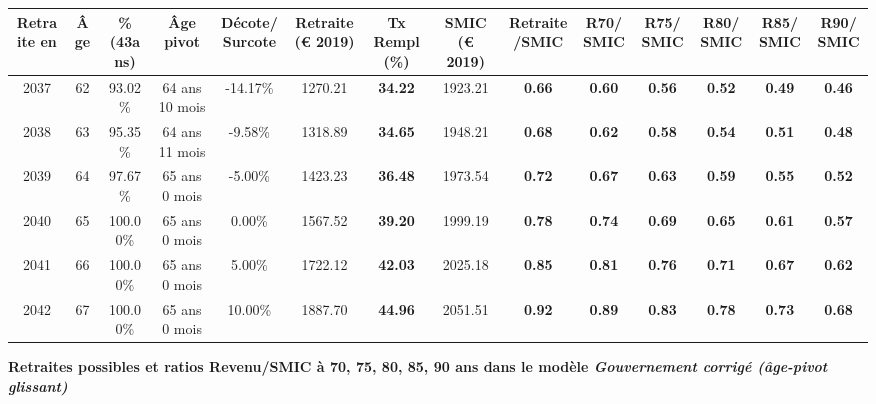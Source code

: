 \begin{adjustbox}{max width=\textwidth} 
\begin{tabular}[htb]{|c|c||c|c|c||c|c||c|c||c|c|c|c|c|} 
\hline 
 Retraite en &  Âge &  \%(43ans) &  Âge pivot &  Décote/Surcote &  Retraite (\euro{} 2019) &  Tx Rempl(\%) &  SMIC (\euro{} 2019) &  Retraite/SMIC &  R70/SMIC &  R75/SMIC &  R80/SMIC &  R85/SMIC &  R90/SMIC \\ 
\hline \hline 
 2037 &  62 &  93.02\% &  64 ans 10 mois &  -14.17\% &  1270.21 &  {\bf 34.22} &  1923.21 &  {\bf {\color{red} 0.66}} &  {\bf {\color{red} 0.60}} &  {\bf {\color{red} 0.56}} &  {\bf {\color{red} 0.52}} &  {\bf {\color{red} 0.49}} &  {\bf {\color{red} 0.46}} \\ 
\hline 
 2038 &  63 &  95.35\% &  64 ans 11 mois &  -9.58\% &  1318.89 &  {\bf 34.65} &  1948.21 &  {\bf {\color{red} 0.68}} &  {\bf {\color{red} 0.62}} &  {\bf {\color{red} 0.58}} &  {\bf {\color{red} 0.54}} &  {\bf {\color{red} 0.51}} &  {\bf {\color{red} 0.48}} \\ 
\hline 
 2039 &  64 &  97.67\% &  65 ans 0 mois &  -5.00\% &  1423.23 &  {\bf 36.48} &  1973.54 &  {\bf {\color{red} 0.72}} &  {\bf {\color{red} 0.67}} &  {\bf {\color{red} 0.63}} &  {\bf {\color{red} 0.59}} &  {\bf {\color{red} 0.55}} &  {\bf {\color{red} 0.52}} \\ 
\hline 
 2040 &  65 &  100.00\% &  65 ans 0 mois &  0.00\% &  1567.52 &  {\bf 39.20} &  1999.19 &  {\bf {\color{red} 0.78}} &  {\bf {\color{red} 0.74}} &  {\bf {\color{red} 0.69}} &  {\bf {\color{red} 0.65}} &  {\bf {\color{red} 0.61}} &  {\bf {\color{red} 0.57}} \\ 
\hline 
 2041 &  66 &  100.00\% &  65 ans 0 mois &  5.00\% &  1722.12 &  {\bf 42.03} &  2025.18 &  {\bf {\color{red} 0.85}} &  {\bf {\color{red} 0.81}} &  {\bf {\color{red} 0.76}} &  {\bf {\color{red} 0.71}} &  {\bf {\color{red} 0.67}} &  {\bf {\color{red} 0.62}} \\ 
\hline 
 2042 &  67 &  100.00\% &  65 ans 0 mois &  10.00\% &  1887.70 &  {\bf 44.96} &  2051.51 &  {\bf {\color{red} 0.92}} &  {\bf {\color{red} 0.89}} &  {\bf {\color{red} 0.83}} &  {\bf {\color{red} 0.78}} &  {\bf {\color{red} 0.73}} &  {\bf {\color{red} 0.68}} \\ 
\hline 
\hline 
\end{tabular} 
\end{adjustbox} 
 
 \vspace{0.1cm} 
{\bf \noindent Retraites possibles et ratios Revenu/SMIC à 70, 75, 80, 85, 90 ans dans le modèle \emph{Gouvernement corrigé (âge-pivot glissant)}}  
 

